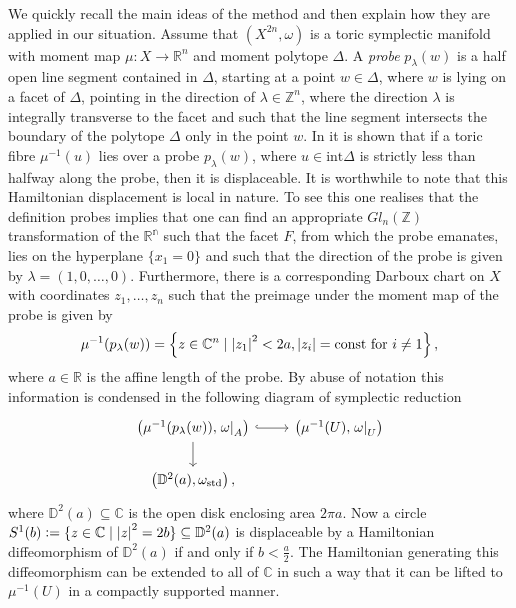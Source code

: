 \documentclass[12pt,a4paper,draft]{scrartcl}
\begin{document}
We quickly recall the main ideas of the method and then explain how they are applied in our situation.
Assume that $(X^{2n},\omega)$ is a toric symplectic manifold with moment map $\mu:X\to ℝ^n$ and moment polytope $\Delta$.
A \textit{probe} $p_\lambda(w)$ is a half open line segment contained in $\Delta$, starting at a point $w \in \Delta$, where $w$ is lying on a facet of $\Delta$, pointing in the direction of $\lambda \in ℤ^n$, where the direction  $\lambda$ is integrally transverse to the facet and such that the line segment intersects the boundary of the polytope $\Delta$ only in the point $w$.
In \cite[Lemma 2.4.]{mcduff2011displacing} it is shown that if a toric fibre $\mu^{-1}(u)$ lies over a probe $p_\lambda(w)$, where $u\in \text{int}\Delta$ is strictly less than halfway along the probe, then it is displaceable.
It is worthwhile to note that this Hamiltonian displacement is local in nature.
To see this one realises that the definition probes implies that one can find an appropriate $Gl_n(\mathbb{Z})$ transformation of the $\mathbb{R^n}$ such that the facet $F$, from which the probe emanates, lies on the hyperplane $\{x_1=0\}$ and such that the direction of the probe is given by $\lambda=(1,0,\ldots,0)$.
Furthermore, there is a corresponding Darboux chart on $X$ with coordinates $z_1,\ldots,z_n$ such that the preimage under the moment map of the probe is given by
\begin{equation*}
  \mu^{-1}(p_\lambda(w))=\left\{z\in \mathbb{C}^n \mid \abs{z_1}^2<2a, \abs{z_i}=\text{const for }i\neq 1\right\},
\end{equation*}
where $a \in \mathbb{R}$ is the affine length of the probe.
By abuse of notation this information is condensed in the following diagram of symplectic reduction
\[
\begin{tikzcd}
  \left(\mu^{-1}(p_\lambda(w)),\left.\omega\right|_A\right)\ar[r,hook]\ar[d]&
  \left(\mu^{-1}(U),\left.\omega\right|_U\right)
  \\
  \left(\mathbb{D}^2(a),\omega_\text{std}\right),
\end{tikzcd}
\]
where $\mathbb{D}^2(a)\subseteq \mathbb{C}$ is the open disk enclosing area $2\pi a$.
Now a circle $S^1(b)\vcentcolon=\{z\in \mathbb{C}\mid \abs{z}^2=2b\} \subseteq \mathbb{D}^2(a)$ is displaceable by a Hamiltonian diffeomorphism of $\mathbb{D}^2(a)$ if and only if $b<\frac{a}{2}$.
The Hamiltonian generating this diffeomorphism can be extended to all of $\mathbb{C}$ in such a way that it can be lifted to $\mu^{-1}(U)$ in a compactly supported manner.
\end{document}
